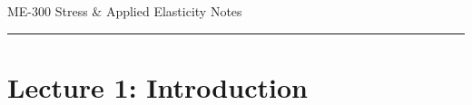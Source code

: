 ﻿\documentclass[12pt]{article}
\begin{document}
\begin{center}
{\LARGE ME-300 Stress \& Applied Elasticity Notes\par}
\end{center}
\hrule
\vspace{1.5em}

\section*{Lecture 1: Introduction}
\end{document}
